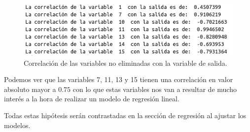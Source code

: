 \documentclass[12pt,a4paper]{article}
\begin{document}
\begin{figure}[H]
	\centering
	\includegraphics[scale=0.6]{./Imagenes/correlacion_variable_salida1.png}
	\caption{Correlación de las variables no eliminadas con la variable de salida.}
\end{figure}

Podemos ver que las variables 7, 11, 13 y 15 tienen una correlación en valor absoluto mayor a $0.75$ con lo que estas variables nos van a resultar de mucho interés a la hora de realizar un modelo de regresión lineal.

Todas estas hipótesis serán contrastadas en la sección de regresión al ajustar los modelos.
\end{document}
